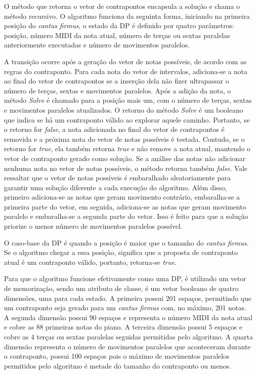       O método que retorna o vetor de contrapontos encapsula a solução e chama o método recursivo. O algoritmo funciona da seguinta forma, iniciando na primeira posição do \textit{cantus firmus}, o estado da DP é definido por quatro parâmetros: posição, número MIDI da nota atual, número de terças ou sextas paralelas anteriormente executadas e número de movimentos paralelos.

      A transição ocorre após a geração do vetor de notas possíveis, de acordo com as regras do contraponto. Para cada nota do vetor de intervalos, adiciona-se a nota ao final do vetor de contrapontos se a inserção dela não fizer ultrapassar o número de terças, sextas e movimentos paralelos. Após a adição da nota, o método \textit{Solve} é chamado para a posição mais um, com o número de terças, sextas e movimentos paralelos atualizados. O retorno do método \textit{Solve} é um booleano que indica se há um contraponto válido ao explorar aquele caminho. Portanto, se o retorno for \textit{false}, a nota adicionada no final do vetor de contrapontos é removida e a próxima nota do vetor de notas possíveis é testada. Contudo, se o retorno for \textit{true}, ela também retorna \textit{true} e não remove a nota atual, mantendo o vetor de contraponto gerado como solução. Se a análise das notas não adicionar nenhuma nota no vetor de notas possíveis, o método retorna também \textit{false}. Vale ressaltar que o vetor de notas possíveis é embaralhado aleatoriamente para garantir uma solução diferente a cada execução do algoritmo. Além disso, primeiro adiciona-se as notas que geram movimento contrário, embaralha-se a primeira parte do vetor, em seguida, adiciona-se as notas que geram movimento paralelo e embaralha-se a segunda parte do vetor. Isso é feito para que a solução priorize o menor número de movimentos paralelos possível.

      O caso-base da DP é quando a posição é maior que o tamanho do \textit{cantus firmus}. Se o algoritmo chegar a essa posição, significa que a proposta de contraponto atual é um contraponto válido, portanto, retorna-se \textit{true}.

      Para que o algoritmo funcione efetivamente como uma DP, é utilizado um vetor de memorização, sendo um atributo de classe, é um vetor booleano de quatro dimensões, uma para cada estado. A primeira possui 201 espaços, permitindo que um contraponto seja gerado para um \textit{cantus firmus} com, no máximo, 201 notas. A segunda dimensão possui 90 espaços e representa o número MIDI da nota atual e cobre as 88 primeiras notas do piano. A terceira dimensão possui 5 espaços e cobre as 4 terças ou sextas paralelas seguidas permitidas pelo algoritmo. A quarta dimensão representa o número de movimentos paralelos que aconteceram durante o contraponto, possui 100 espaços pois o máximo de movimentos paralelos permitidos pelo algoritmo é metade do tamanho do contraponto ou menos.


